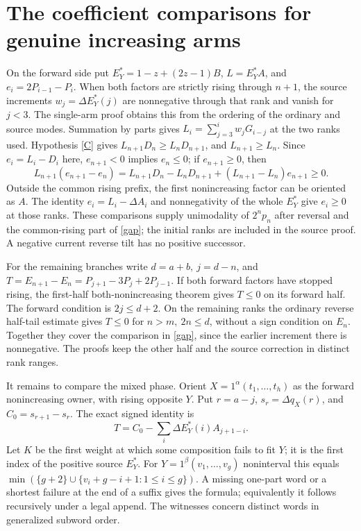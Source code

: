 \documentclass[11pt]{article}
\begin{document}
\section{The coefficient comparisons for genuine increasing arms}
On the forward side put \(E_Y^*=1-z+(2z-1)B\),
\(L=E_Y^*A\), and \(e_i=2P_{i-1}-P_i\).
When both factors are strictly rising through \(n+1\),
the source increments \(w_j=\Delta E_Y^*(j)\) are nonnegative through
that rank and vanish for \(j<3\). The single-arm proof obtains this from
the ordering of the ordinary and source modes. Summation by parts gives
\(L_i=\sum_{j=3}^iw_jG_{i-j}\) at the two ranks used. Hypothesis
\eqref{C} gives \(L_{n+1}D_n\ge L_nD_{n+1}\), and \(L_{n+1}\ge L_n\).
Since \(e_i=L_i-D_i\) here, \(e_{n+1}<0\) implies \(e_n\le0\);
if \(e_{n+1}\ge0\), then
\[
 L_{n+1}(e_{n+1}-e_n)
 = L_{n+1}D_n-L_nD_{n+1}+(L_{n+1}-L_n)e_{n+1}\ge0.
\]
Outside the common rising prefix, the first nonincreasing factor can
be oriented as \(A\). The identity \(e_i=L_i-\Delta A_i\) and
nonnegativity of the whole \(E_Y^*\) give \(e_i\ge0\) at those ranks.
These comparisons supply unimodality of \(2^np_n\) after reversal and
the common-rising part of \eqref{gap}; the initial ranks are included
in the source proof. A negative current reverse tilt has no positive
successor.

For the remaining branches write \(d=a+b,\ j=d-n\), and
\(T=E_{n+1}-E_n=P_{j+1}-3P_j+2P_{j-1}\).
If both forward factors have stopped rising, the first-half
both-nonincreasing theorem gives \(T\le0\) on its forward half.
The forward condition is \(2j\le d+2\). On the remaining ranks the ordinary reverse half-tail estimate gives
\(T\le0\) for \(n>m,\ 2n\le d\), without a sign condition on \(E_n\).
Together they cover the comparison in \eqref{gap}, since the earlier
increment there is nonnegative. The proofs keep the other half and the
source correction in distinct rank ranges.

It remains to compare the mixed phase. Orient \(X=1^\alpha(t_1,\ldots,t_h)\)
as the forward nonincreasing owner, with rising opposite \(Y\).
Put \(r=a-j\), \(s_r=\Delta q_X(r)\), and \(C_0=s_{r+1}-s_r\).
The exact signed identity is
\begin{equation}
 T=C_0-\sum_i \Delta E_Y^*(i)A_{j+1-i}.                         \label{mixed}
\end{equation}
Let \(K\) be the first weight at which some composition fails to fit
\(Y\); it is the first index of the positive source \(E_Y^*\).
For \(Y=1^\beta(v_1,\ldots,v_g)\) noninterval this equals
\(\min(\{g+2\}\cup\{v_i+g-i+1:1\le i\le g\})\).
A missing one-part word or a shortest failure at the end of a suffix
gives the formula; equivalently it follows recursively under a legal
append. The witnesses concern distinct words in generalized subword order.
\end{document}

